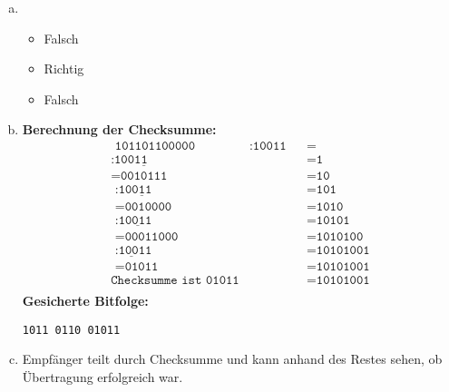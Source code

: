     \begin{enumerate}[a)]
        \item 
        \begin{itemize}
            \item Falsch
            \item Richtig
            \item Falsch
        \end{itemize}
    
        \item 
        
        \textbf{Berechnung der Checksumme:}
        \begin{align*}
            \texttt{ 101101100000} &: \texttt{10011} && = \\
            \underline{\texttt{:10011~~~~~~~}} &                  && = \texttt{1} \\ 
            \texttt{=0010111~~~~~} &                  && = \texttt{10} \\
            \underline{\texttt{  :10011~~~~~}} &                  && = \texttt{101} \\ 
            \texttt{  =0010000~~~} &                  && = \texttt{1010} \\
            \underline{\texttt{    :10011~~~}} &                  && = \texttt{10101} \\ 
            \texttt{    =00011000} &                  && = \texttt{1010100} \\
            \underline{\texttt{       :10011}} &                  && = \texttt{10101001} \\
            \texttt{       =01011} &                  && = \texttt{10101001} \\
     \texttt{Checksumme ist 01011} &                  && = \texttt{10101001} \\
        \end{align*}
        \textbf{Gesicherte Bitfolge:}
        
        \texttt{1011 0110 01011}
        
        \item Empfänger teilt durch Checksumme und kann anhand des Restes sehen, ob Übertragung erfolgreich war.
        
    \end{enumerate}


